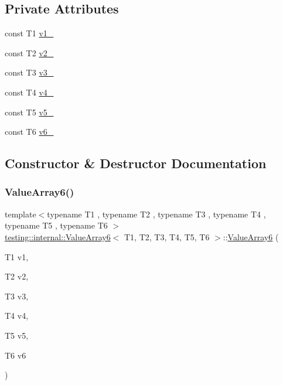 \subsection*{Private Attributes}
\begin{DoxyCompactItemize}
\item 
const T1 \mbox{\hyperlink{classtesting_1_1internal_1_1_value_array6_a9c36c0865cd8d803cf0af29679095c3b}{v1\+\_\+}}
\item 
const T2 \mbox{\hyperlink{classtesting_1_1internal_1_1_value_array6_a788f6dfd6f04137b182d46c78950bc6a}{v2\+\_\+}}
\item 
const T3 \mbox{\hyperlink{classtesting_1_1internal_1_1_value_array6_a6262408c3ee594da5cf08e46d0b5378f}{v3\+\_\+}}
\item 
const T4 \mbox{\hyperlink{classtesting_1_1internal_1_1_value_array6_a42be8191641aa46761a8029ebbb594f8}{v4\+\_\+}}
\item 
const T5 \mbox{\hyperlink{classtesting_1_1internal_1_1_value_array6_a693e1ac4fe3942c4c58ebeff5d2dfb98}{v5\+\_\+}}
\item 
const T6 \mbox{\hyperlink{classtesting_1_1internal_1_1_value_array6_a7dad64c4f26bd14b24b7d954edd52550}{v6\+\_\+}}
\end{DoxyCompactItemize}


\subsection{Constructor \& Destructor Documentation}
\mbox{\label{classtesting_1_1internal_1_1_value_array6_ad1c323929591d89807220281ceb6d4d5}} 
\subsubsection{\texorpdfstring{ValueArray6()}{ValueArray6()}\hspace{0.1cm}{\footnotesize\ttfamily [1/2]}}
{\footnotesize\ttfamily template$<$typename T1 , typename T2 , typename T3 , typename T4 , typename T5 , typename T6 $>$ \\
\mbox{\hyperlink{classtesting_1_1internal_1_1_value_array6}{testing\+::internal\+::\+Value\+Array6}}$<$ T1, T2, T3, T4, T5, T6 $>$\+::\mbox{\hyperlink{classtesting_1_1internal_1_1_value_array6}{Value\+Array6}} (\begin{DoxyParamCaption}\item[{T1}]{v1,  }\item[{T2}]{v2,  }\item[{T3}]{v3,  }\item[{T4}]{v4,  }\item[{T5}]{v5,  }\item[{T6}]{v6 }\end{DoxyParamCaption})\hspace{0.3cm}{\ttfamily [inline]}}

